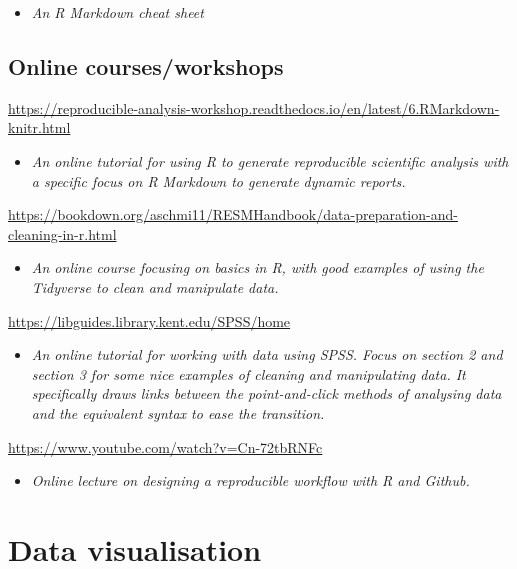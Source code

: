 \documentclass[
]{book}
\providecommand{\tightlist}{%
  \setlength{\itemsep}{0pt}\setlength{\parskip}{0pt}}
\begin{document}
\begin{itemize}
\tightlist
\item
  \emph{An R Markdown cheat sheet}
\end{itemize}

\section{Online courses/workshops}\label{online-coursesworkshops}

\url{https://reproducible-analysis-workshop.readthedocs.io/en/latest/6.RMarkdown-knitr.html}

\begin{itemize}
\tightlist
\item
  \emph{An online tutorial for using R to generate reproducible scientific analysis with a specific focus on R Markdown to generate dynamic reports.}
\end{itemize}

\url{https://bookdown.org/aschmi11/RESMHandbook/data-preparation-and-cleaning-in-r.html}

\begin{itemize}
\tightlist
\item
  \emph{An online course focusing on basics in R, with good examples of using the Tidyverse to clean and manipulate data.}
\end{itemize}

\url{https://libguides.library.kent.edu/SPSS/home}

\begin{itemize}
\tightlist
\item
  \emph{An online tutorial for working with data using SPSS. Focus on section 2 and section 3 for some nice examples of cleaning and manipulating data. It specifically draws links between the point-and-click methods of analysing data and the equivalent syntax to ease the transition.}
\end{itemize}

\url{https://www.youtube.com/watch?v=Cn-72tbRNFc}

\begin{itemize}
\tightlist
\item
  \emph{Online lecture on designing a reproducible workflow with R and Github.}
\end{itemize}

\chapter{Data visualisation}\label{data-visualisation}
\end{document}
